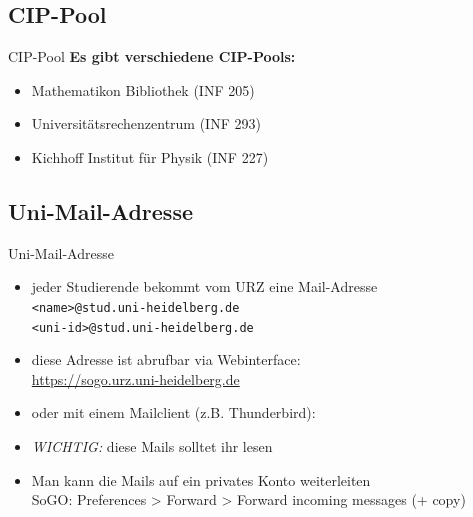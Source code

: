 \subsection{CIP-Pool}
\begin{frame}{CIP-Pool}
    \large
    \textbf{Es gibt verschiedene CIP-Pools:}
    \begin{itemize}
        \item Mathematikon Bibliothek (INF 205)
        \item Universitätsrechenzentrum (INF 293)
        \item Kichhoff Institut für Physik (INF 227)
    \end{itemize}
\end{frame}


\subsection{Uni-Mail-Adresse}
\begin{frame}{Uni-Mail-Adresse}
    \begin{itemize}
        \item<+-> jeder Studierende bekommt vom URZ eine Mail-Adresse \\
            \texttt{<name>@stud.uni-heidelberg.de} \\
            \texttt{<uni-id>@stud.uni-heidelberg.de} \\
        \item<+->diese Adresse ist abrufbar via Webinterface: \\
            \url{https://sogo.urz.uni-heidelberg.de} \\
        \item<+-> oder mit einem Mailclient (z.B. Thunderbird): \\
        \item<+-> \emph{WICHTIG:} diese Mails solltet ihr lesen
        \item<+-> Man kann die Mails auf ein privates Konto weiterleiten \\
            SoGO: Preferences > Forward > Forward incoming messages (+ copy)
    \end{itemize}
\end{frame}

